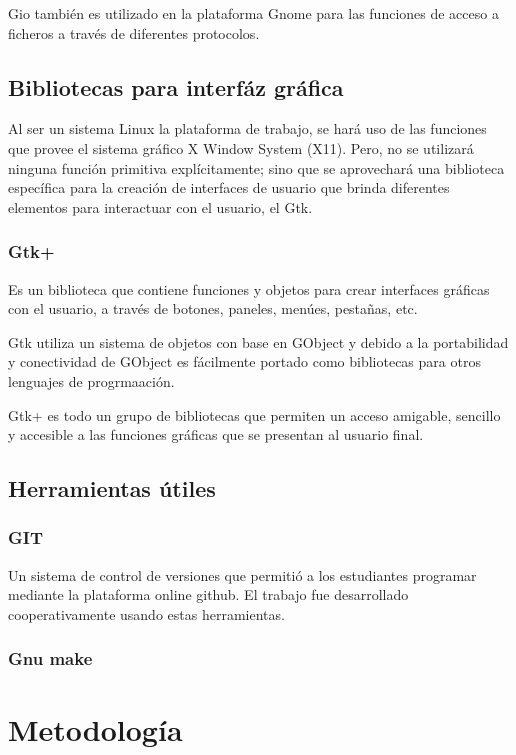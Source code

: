 \documentclass[letterpaper,10pt]{article}
\begin{document}
Gio también es utilizado en la plataforma Gnome para las funciones de acceso a ficheros 
a través de diferentes protocolos.

\subsection{Bibliotecas para interfáz gráfica}
Al ser un sistema Linux la plataforma de trabajo, se hará uso de las funciones que provee
el sistema gráfico X Window System (X11). Pero, no se utilizará ninguna función primitiva 
explícitamente; sino que se aprovechará una biblioteca específica para la creación de interfaces 
de usuario que brinda diferentes elementos para interactuar con el usuario, el Gtk.

\subsubsection{Gtk+}
Es un biblioteca que contiene funciones y objetos para crear interfaces gráficas con el usuario,
a través de botones, paneles, menúes, pestañas, etc.

Gtk utiliza un sistema de objetos con base en GObject y debido a la portabilidad y conectividad 
de GObject es fácilmente portado como bibliotecas para otros lenguajes de progrmaación.

Gtk+ es todo un grupo de bibliotecas que permiten un acceso amigable, sencillo y accesible 
a las funciones gráficas que se presentan al usuario final.

\subsection{Herramientas útiles}
\subsubsection{GIT}
Un sistema de control de versiones que permitió a los estudiantes programar mediante 
la plataforma online github. El trabajo fue desarrollado cooperativamente usando estas herramientas.

\subsubsection{Gnu make}

\section{Metodología}
\end{document}
